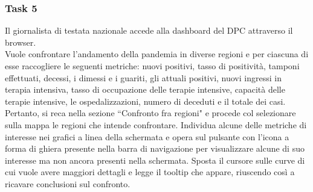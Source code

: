 
\subsubsection{Task 5}
\label{sss:cw-task-5}

Il giornalista di testata nazionale accede alla dashboard del DPC attraverso il browser.\\
Vuole confrontare l'andamento della pandemia in diverse regioni e per ciascuna di esse raccogliere le seguenti metriche: nuovi positivi, tasso di positività, tamponi effettuati, decessi, i dimessi e i guariti, gli attuali positivi, nuovi ingressi in terapia intensiva, tasso di occupazione delle terapie intensive, capacità delle terapie intensive, le ospedalizzazioni, numero di deceduti e il totale dei casi.\\
Pertanto, si reca nella sezione ``Confronto fra regioni" e procede col selezionare sulla mappa le regioni che intende confrontare.
Individua alcune delle metriche di interesse nei grafici a linea della schermata e opera sul pulsante con l'icona a forma di ghiera presente nella barra di navigazione per visualizzare alcune di suo interesse ma non ancora presenti nella schermata.
Sposta il cursore sulle curve di cui vuole avere maggiori dettagli e legge il tooltip che appare, riuscendo così a ricavare conclusioni sul confronto.